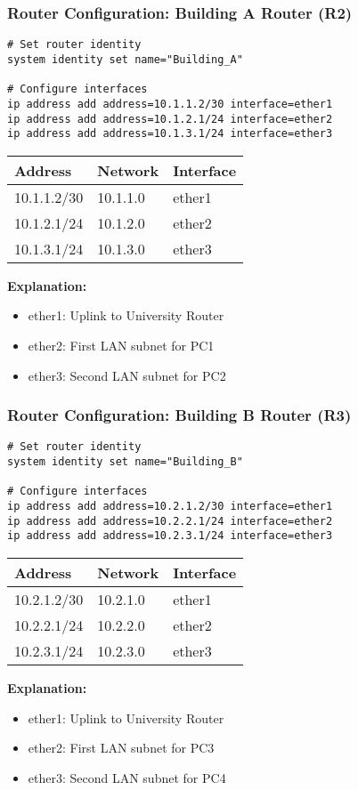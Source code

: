 \documentclass{beamer}
\begin{document}
\begin{frame}
\frametitle{Router Configuration: Building A Router (R2)}
\begin{lstlisting}[escapechar=|]
# Set router identity
system identity set name="Building_A"

# Configure interfaces
ip address add address=10.1.1.2/30 interface=ether1
ip address add address=10.1.2.1/24 interface=ether2 
ip address add address=10.1.3.1/24 interface=ether3
\end{lstlisting}

\begin{table}
\centering
\begin{tabular}{|l|l|l|}
\hline
\textbf{Address} & \textbf{Network} & \textbf{Interface} \\
\hline
10.1.1.2/30 & 10.1.1.0 & ether1 \\
\hline
10.1.2.1/24 & 10.1.2.0 & ether2 \\
\hline
10.1.3.1/24 & 10.1.3.0 & ether3 \\
\hline
\end{tabular}
\end{table}

\textbf{Explanation:}
\begin{itemize}
    \item ether1: Uplink to University Router
    \item ether2: First LAN subnet for PC1
    \item ether3: Second LAN subnet for PC2
\end{itemize}
\end{frame}

\begin{frame}
\frametitle{Router Configuration: Building B Router (R3)}
\begin{lstlisting}[escapechar=|]
# Set router identity
system identity set name="Building_B"

# Configure interfaces
ip address add address=10.2.1.2/30 interface=ether1
ip address add address=10.2.2.1/24 interface=ether2    
ip address add address=10.2.3.1/24 interface=ether3
\end{lstlisting}

\begin{table}
\centering
\begin{tabular}{|l|l|l|}
\hline
\textbf{Address} & \textbf{Network} & \textbf{Interface} \\
\hline
10.2.1.2/30 & 10.2.1.0 & ether1 \\
\hline
10.2.2.1/24 & 10.2.2.0 & ether2 \\
\hline
10.2.3.1/24 & 10.2.3.0 & ether3 \\
\hline
\end{tabular}
\end{table}

\textbf{Explanation:}
\begin{itemize}
    \item ether1: Uplink to University Router
    \item ether2: First LAN subnet for PC3
    \item ether3: Second LAN subnet for PC4
\end{itemize}
\end{frame}
\end{document}
